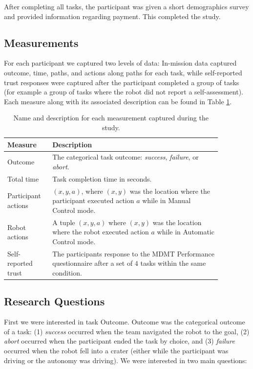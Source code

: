\documentclass[aaai]{article}
\begin{document}
After completing all tasks, the participant was given a short demographics survey and provided information regarding payment. This completed the study.

\subsection{Measurements}
For each participant we captured two levels of data: In-mission data captured outcome, time, paths, and actions along paths for each task, while self-reported trust responses were captured after the participant completed a group of tasks (for example a group of tasks where the robot did not report a self-assessment). Each measure along with its associated description can be found in Table \ref{measures_table}.

\begin{table}[h]
    \begin{center}
    \begin{tabular}{|p{0.17\linewidth}||p{0.70\linewidth}|}
    \hline
    \textbf{Measure} & \textbf{Description} \\
    \hline
    \hline
    Outcome & The categorical task outcome: \emph{success}, \emph{failure}, or \emph{abort}.\\
    \hline
    Total time & Task completion time in seconds.\\
    \hline
    Participant actions &  $(x,y,a)$, where $(x, y)$ was the location where the participant executed action $a$ while in Manual Control mode.\\
    \hline
    Robot actions & A tuple $(x,y, a)$ where $(x, y)$ was the location where the robot executed action $a$ while in Automatic Control mode.\\
    \hline
    Self-reported trust &  The participants response to the MDMT Performance questionnaire after a set of $4$ tasks within the same condition.\\
    \hline
    \end{tabular}
    \end{center}
    \caption{Name and description for each measurement captured during the study.}
    \label{measures_table}
\end{table}

\subsection{Research Questions}
First we were interested in task Outcome. Outcome was the categorical outcome of a task: (1) \emph{success} occurred when the team navigated the robot to the goal, (2) \emph{abort} occurred when the participant ended the task by choice, and (3) \emph{failure} occurred when the robot fell into a crater (either while the participant was driving or the autonomy was driving). We were interested in two main questions:
\end{document}

